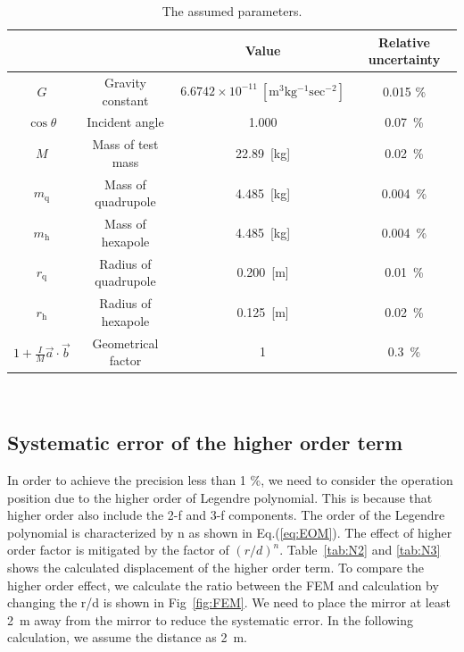 \documentclass[A4]{spie}  %
\begin{document}
\begin{table}
\begin{center}
\caption{\label{sus}The assumed parameters.}
\footnotesize
\begin{tabular}{cccc}
\hline
&&Value&Relative uncertainty \\
\hline
$G$& Gravity constant&$6.6742 \times 10^{-11}~\mathrm{[m^3kg^{-1}sec^{-2}]}$&0.015 \%\\
$\cos{\theta}$& Incident angle&1.000& 0.07~\%\\
$M$& Mass of test mass&22.89~[kg] & 0.02~\%\\
$m_{\mathrm{q}}$&Mass of quadrupole&4.485~[kg] & 0.004~\%\\
$m_{\mathrm{h}}$&Mass of hexapole& 4.485~[kg] &0.004~\%\\
$r_{\mathrm{q}}$&Radius of quadrupole&0.200~[m] & 0.01~\%\\
$r_{\mathrm{h}}$&Radius of hexapole& 0.125~[m] & 0.02~\%\\
$1+\frac{I}{M}\vec{a}\cdot \vec{b}$& Geometrical factor & 1&0.3~\% \\
\hline
\end{tabular}\\
\end{center}
\end{table}

\subsection{Systematic error of the higher order term}
In order to achieve the precision less than 1 \%, we need to consider the operation position due to the higher order of Legendre polynomial. This is because that higher order also include the 2-f and 3-f components. The order of the Legendre polynomial is characterized by n as shown in Eq.(\ref{eq:EOM}). The effect of higher order factor is mitigated by the factor of $(r/d)^n$. Table~\ref{tab:N2} and \ref{tab:N3} shows the calculated displacement of the higher order term. To compare the higher order effect, we calculate the ratio between the FEM and calculation by changing the r/d is shown in Fig~\ref{fig:FEM}. We need to place the mirror at least 2~m away from the mirror to reduce the systematic error. In the following calculation, we assume the distance as 2~m. 
\end{document}
